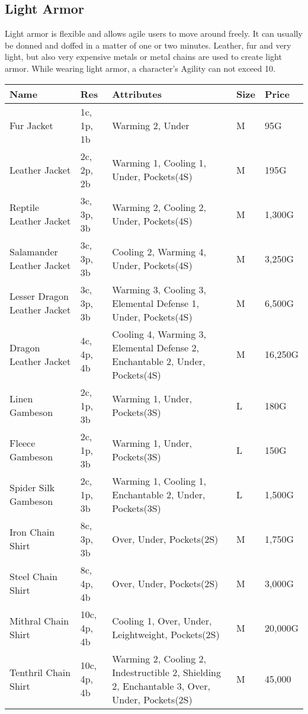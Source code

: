 \subsection{Light Armor}\label{subsec:lightArmor}

Light armor is flexible and allows agile users to move around freely.
It can usually be donned and doffed in a matter of one or two minutes.
Leather, fur and very light, but also very expensive metals or metal chains are used to create light armor.
While wearing light armor, a character's Agility can not exceed 10.

\begin{longtable}{p{3.5cm} | p{1.5cm} | p{5cm} | p{1cm} | p{1.25cm}}
	Name & Res &  Attributes & Size & Price\\ \hline
	Fur Jacket & 1c, 1p, 1b & Warming 2, Under & M & 95G\\
	
	Leather Jacket & 2c, 2p, 2b & Warming 1, Cooling 1, Under, Pockets(4S)  & M & 195G\\
	
	Reptile Leather Jacket & 3c, 3p, 3b & Warming 2, Cooling 2, Under, Pockets(4S) & M & 1,300G\\
	
	Salamander Leather Jacket & 3c, 3p, 3b & Cooling 2, Warming 4, Under, Pockets(4S) & M & 3,250G\\
	
	Lesser Dragon Leather Jacket & 3c, 3p, 3b & Warming 3, Cooling 3, Elemental Defense 1, Under, Pockets(4S) & M & 6,500G\\
	
	Dragon Leather Jacket & 4c, 4p, 4b & Cooling 4, Warming 3, Elemental Defense 2, Enchantable 2, Under, Pockets(4S) & M & 16,250G\\
	
	Linen Gambeson & 2c, 1p, 3b & Warming 1, Under, Pockets(3S) & L & 180G\\
	
	Fleece Gambeson & 2c, 1p, 3b & Warming 1, Under, Pockets(3S) & L & 150G\\
	
	Spider Silk Gambeson & 2c, 1p, 3b & Warming 1, Cooling 1, Enchantable 2, Under, Pockets(3S) & L & 1,500G\\
	
	Iron Chain Shirt & 8c, 3p, 3b & Over, Under, Pockets(2S) & M & 1,750G\\
	
	Steel Chain Shirt & 8c, 4p, 4b & Over, Under, Pockets(2S) & M & 3,000G\\
	
	Mithral Chain Shirt & 10c, 4p, 4b & Cooling 1, Over, Under, Leightweight, Pockets(2S) & M & 20,000G\\
	
	Tenthril Chain Shirt & 10c, 4p, 4b & Warming 2, Cooling 2, Indestructible 2, Shielding 2, Enchantable 3, Over, Under, Pockets(2S) & M & 45,000\\
\end{longtable}